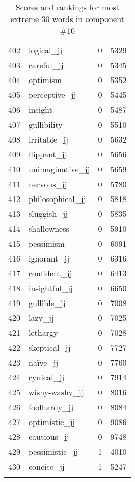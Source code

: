 \begin{longtable}[!htbp]{| rlr@{.}l |}
    402 & logical\_jj & 0 & 5329 \\
    403 & careful\_jj & 0 & 5345 \\
    404 & optimism & 0 & 5352 \\
    405 & perceptive\_jj & 0 & 5445 \\
    406 & insight & 0 & 5487 \\
    407 & gullibility & 0 & 5510 \\
    408 & irritable\_jj & 0 & 5632 \\
    409 & flippant\_jj & 0 & 5656 \\
    410 & unimaginative\_jj & 0 & 5659 \\
    411 & nervous\_jj & 0 & 5780 \\
    412 & philosophical\_jj & 0 & 5818 \\
    413 & sluggish\_jj & 0 & 5835 \\
    414 & shallowness & 0 & 5910 \\
    415 & pessimism & 0 & 6091 \\
    416 & ignorant\_jj & 0 & 6316 \\
    417 & confident\_jj & 0 & 6413 \\
    418 & insightful\_jj & 0 & 6650 \\
    419 & gullible\_jj & 0 & 7008 \\
    420 & lazy\_jj & 0 & 7025 \\
    421 & lethargy & 0 & 7028 \\
    422 & skeptical\_jj & 0 & 7727 \\
    423 & naïve\_jj & 0 & 7760 \\
    424 & cynical\_jj & 0 & 7914 \\
    425 & wishy-washy\_jj & 0 & 8016 \\
    426 & foolhardy\_jj & 0 & 8084 \\
    427 & optimistic\_jj & 0 & 9086 \\
    428 & cautious\_jj & 0 & 9748 \\
    429 & pessimistic\_jj & 1 & 4010 \\
    430 & concise\_jj & 1 & 5247 \\
    \hline
    \caption{Scores and rankings for most extreme 30 words in component \#10} \\
\end{longtable}
